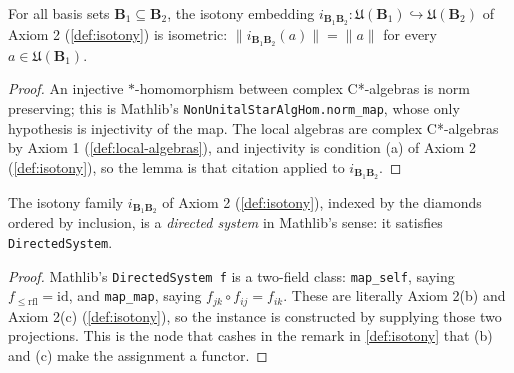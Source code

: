 \begin{lemma}
    \label{lmm:isotony-embeddings-isometric}
    For all basis sets $\mathbf{B}_1 \subseteq \mathbf{B}_2$, the isotony embedding $i_{\mathbf{B}_1\mathbf{B}_2} : \mathfrak{U}(\mathbf{B}_1) \hookrightarrow \mathfrak{U}(\mathbf{B}_2)$ of Axiom 2 (\ref{def:isotony}) is isometric: $\|i_{\mathbf{B}_1\mathbf{B}_2}(a)\| = \|a\|$ for every $a \in \mathfrak{U}(\mathbf{B}_1)$.
\end{lemma}
\begin{proof}
    An injective $*$-homomorphism between complex C*-algebras is norm preserving; this is Mathlib's \texttt{NonUnitalStarAlgHom.norm\_map}, whose only hypothesis is injectivity of the map. The local algebras are complex C*-algebras by Axiom 1 (\ref{def:local-algebras}), and injectivity is condition (a) of Axiom 2 (\ref{def:isotony}), so the lemma is that citation applied to $i_{\mathbf{B}_1\mathbf{B}_2}$.
\end{proof}

\begin{lemma}
    \label{lmm:isotony-directed-system}
    The isotony family $i_{\mathbf{B}_1\mathbf{B}_2}$ of Axiom 2 (\ref{def:isotony}), indexed by the diamonds ordered by inclusion, is a \emph{directed system} in Mathlib's sense: it satisfies \texttt{DirectedSystem}.
\end{lemma}
\begin{proof}
    Mathlib's \texttt{DirectedSystem f} is a two-field class: \texttt{map\_self}, saying $f_{\le\mathrm{rfl}} = \mathrm{id}$, and \texttt{map\_map}, saying $f_{jk} \circ f_{ij} = f_{ik}$. These are literally Axiom 2(b) and Axiom 2(c) (\ref{def:isotony}), so the instance is constructed by supplying those two projections. This is the node that cashes in the remark in \ref{def:isotony} that (b) and (c) make the assignment a functor.
\end{proof}

